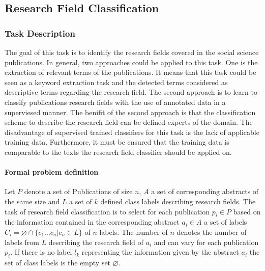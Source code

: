 
\subsection{Research Field Classification}
\label{sec:field_classification}
\subsubsection{Task Description}
The goal of this task is to identify the research fields covered in the social science publications.
In general, two approaches could be applied to this task.
One is the extraction of relevant terms of the publications.
It means that this task could be seen as a keyword extraction task and the detected terms considered as descriptive terms regarding the research field.
The second approach is to learn to classify publications research fields with the use of annotated data in a superviesed manner.
The benifit of the second approach is that the classification scheme to describe the research field can be defined experts of the domain.
The disadvantage of supervised trained classifiers for this task is the lack of applicable training data.
Furthermore, it must be ensured that the training data is comparable to the texts the research field classifier should be applied on.

\paragraph{Formal problem definition}
Let $P$ denote a set of Publications of size $n$, $A$ a set of corresponding abstracts of the same size and $L$ a set of $k$ defined class labels describing research fields.
The task of research field classification is to select for each publication $p_i\in{P}$ based on the information contained in the corresponding abstract $a_i\in{A}$ a set of labels $C_i = \varnothing \cap \{c_1\dots c_n|c_n \in L\}$ of $n$ labels.
The number of $n$ denotes the number of labels from $L$ describing the research field of $a_i$ and can vary for each publication $p_i$.
If there is no label $l_k$ representing the information given by the abstract $a_i$ the set of class labels is the empty set $\varnothing$.



